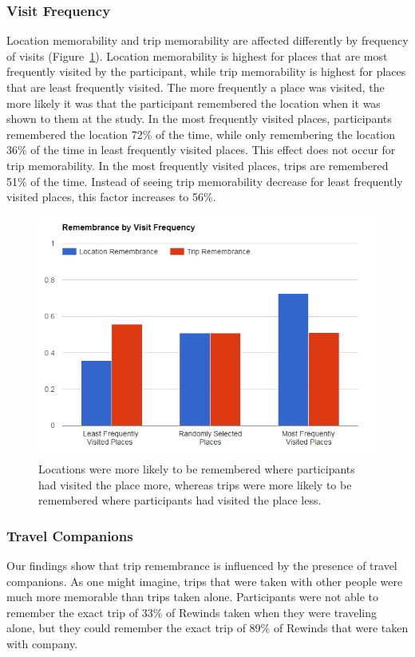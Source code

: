 \documentclass{sigchi}
\begin{document}
\subsubsection{Visit Frequency}
Location memorability and trip memorability are affected differently by frequency of visits (Figure~\ref{fig:frequencymemory}). Location memorability is highest for places that are most frequently visited by the participant, while trip memorability is highest for places that are least frequently visited. The more frequently a place was visited, the more likely it was that the participant remembered the location when it was shown to them at the study. In the most frequently visited places, participants remembered the location 72\% of the time, while only remembering the location 36\% of the time in least frequently visited places. This effect does not occur for trip memorability. In the most frequently visited places, trips are remembered 51\% of the time. Instead of seeing trip memorability decrease for least frequently visited places, this factor increases to 56\%.

\begin{figure}
   \centering
     \includegraphics[width=1\linewidth]{RML_2}
     \caption{Locations were more likely to be remembered where participants had visited the place more, whereas trips were more likely to be remembered where participants had visited the place less.}
     \label{fig:frequencymemory}
\end{figure}

\subsubsection{Travel Companions}
Our findings show that trip remembrance is influenced by the presence of travel companions. As one might imagine, trips that were taken with other people were much more memorable than trips taken alone. Participants were not able to remember the exact trip of 33\% of Rewinds taken when they were traveling alone, but they could remember the exact trip of 89\% of Rewinds that were taken with company.
\end{document}
